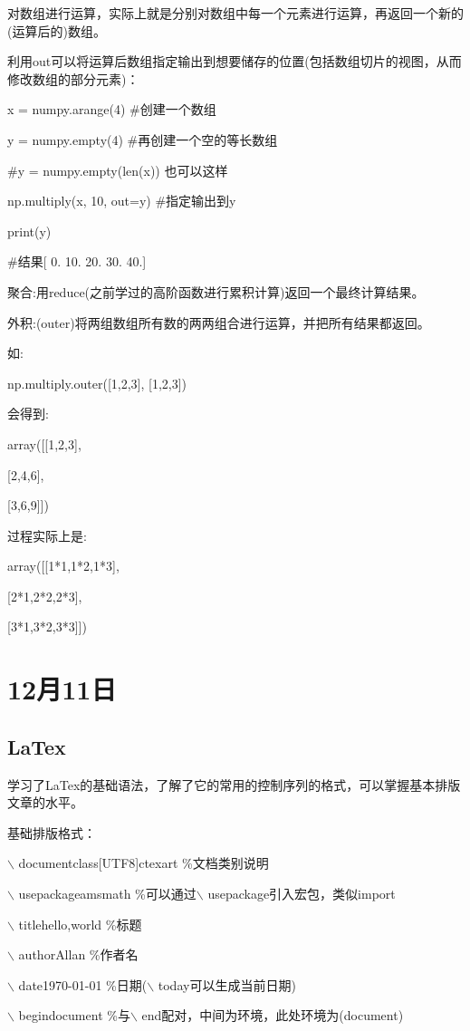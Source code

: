 \documentclass[UTF8]{ctexart}
\begin{document}
对数组进行运算，实际上就是分别对数组中每一个元素进行运算，再返回一个新的(运算后的)数组。


利用out可以将运算后数组指定输出到想要储存的位置(包括数组切片的视图，从而修改数组的部分元素)：

 x = numpy.arange(4)  \#创建一个数组

 y = numpy.empty(4)  \#再创建一个空的等长数组

\#y = numpy.empty(len(x)) 也可以这样


 np.multiply(x, 10, out=y) \#指定输出到y

 print(y) 

\#结果[ 0. 10. 20. 30. 40.]

聚合:用reduce(之前学过的高阶函数进行累积计算)返回一个最终计算结果。

外积:(outer)将两组数组所有数的两两组合进行运算，并把所有结果都返回。

如:

np.multiply.outer([1,2,3], [1,2,3])

会得到:

array([[1,2,3],

[2,4,6],

[3,6,9]])

过程实际上是:

array([[1*1,1*2,1*3],

[2*1,2*2,2*3],

[3*1,3*2,3*3]])
\section{12月11日}
\subsection{LaTex}
学习了LaTex的基础语法，了解了它的常用的控制序列的格式，可以掌握基本排版文章的水平。

基础排版格式：

$\backslash$ documentclass[UTF8]{ctexart} \%文档类别说明

$\backslash$ usepackage{amsmath} \%可以通过$\backslash$ usepackage引入宏包，类似import

$\backslash$ title{hello,world} \%标题

$\backslash$ author{Allan} \%作者名

$\backslash$ date{\today} \%日期($\backslash$ today可以生成当前日期)

$\backslash$ begin{document} \%与$\backslash$ end配对，中间为环境，此处环境为(document)
\end{document}
